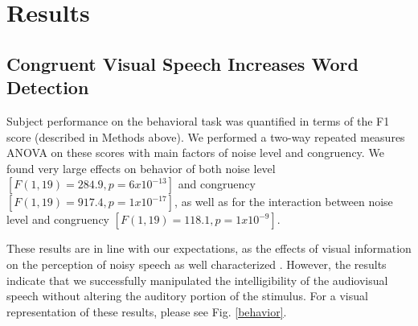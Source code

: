 \documentclass[10pt,letterpaper]{article}
\begin{document}




\section{Results}

\subsection{Congruent Visual Speech Increases Word Detection}

  Subject performance on the behavioral task was quantified in terms of the 
  F1 score (described in Methods above). We performed a two-way repeated 
  measures ANOVA on these scores with main factors of noise level and 
  congruency. We found very large effects on behavior of both noise level 
  $[F(1,19) = 284.9, p = 6 x 10^{-13}]$ and congruency
  $[F(1, 19) = 917.4, p = 1 x 10^{-17}]$, as well as for the interaction 
  between noise level and congruency $[F(1, 19) = 118.1, p = 1 x 10^{-9}]$.

  These results are in line with our expectations, as the effects of visual 
  information on the perception of noisy speech as well characterized 
  \cite{Ross2007}. However, the results indicate that we successfully 
  manipulated the intelligibility of the audiovisual speech without 
  altering the auditory portion of the stimulus.
  For a visual representation of these results, please see Fig. \ref{behavior}.
\end{document}
